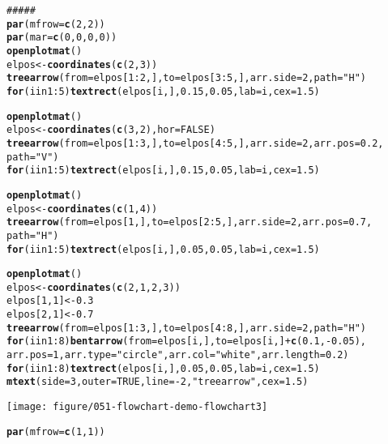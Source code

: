 \documentclass{article}\usepackage{graphicx, color}
\makeatletter
\def\maxwidth{ %
  \ifdim\Gin@nat@width>\linewidth
    \linewidth
  \else
    \Gin@nat@width
  \fi
}
\newcommand{\hlfunctioncall}[1]{\textcolor[rgb]{0.501960784313725,0,0.329411764705882}{\textbf{#1}}}%
\newcommand{\hlstring}[1]{\textcolor[rgb]{0.6,0.6,1}{#1}}%
\newcommand{\hlcomment}[1]{\textcolor[rgb]{0.180392156862745,0.6,0.341176470588235}{#1}}%
\newenvironment{kframe}{%
 \def\at@end@of@kframe{}%
 \ifinner\ifhmode%
  \def\at@end@of@kframe{\end{minipage}}%
  \begin{minipage}{\columnwidth}%
 \fi\fi%
 \def\FrameCommand##1{\hskip\@totalleftmargin \hskip-\fboxsep
 \colorbox{shadecolor}{##1}\hskip-\fboxsep
     \hskip-\linewidth \hskip-\@totalleftmargin \hskip\columnwidth}%
 \MakeFramed {\advance\hsize-\width
   \@totalleftmargin\z@ \linewidth\hsize
   \@setminipage}}%
 {\par\unskip\endMakeFramed%
 \at@end@of@kframe}
\newenvironment{knitrout}{}{} %
\makeatother
\begin{document}
\begin{knitrout}
\begin{kframe}
\begin{alltt}
\hlcomment{#####}
\hlfunctioncall{par}(mfrow = \hlfunctioncall{c}(2, 2))
\hlfunctioncall{par}(mar = \hlfunctioncall{c}(0, 0, 0, 0))
\hlfunctioncall{openplotmat}()
elpos <- \hlfunctioncall{coordinates}(\hlfunctioncall{c}(2, 3))
\hlfunctioncall{treearrow}(from = elpos[1:2, ], to = elpos[3:5, ], arr.side = 2, path = \hlstring{"H"})
\hlfunctioncall{for} (i in 1:5) \hlfunctioncall{textrect}(elpos[i, ], 0.15, 0.05, lab = i, cex = 1.5)

\hlfunctioncall{openplotmat}()
elpos <- \hlfunctioncall{coordinates}(\hlfunctioncall{c}(3, 2), hor = FALSE)
\hlfunctioncall{treearrow}(from = elpos[1:3, ], to = elpos[4:5, ], arr.side = 2, arr.pos = 0.2, 
    path = \hlstring{"V"})
\hlfunctioncall{for} (i in 1:5) \hlfunctioncall{textrect}(elpos[i, ], 0.15, 0.05, lab = i, cex = 1.5)

\hlfunctioncall{openplotmat}()
elpos <- \hlfunctioncall{coordinates}(\hlfunctioncall{c}(1, 4))
\hlfunctioncall{treearrow}(from = elpos[1, ], to = elpos[2:5, ], arr.side = 2, arr.pos = 0.7, 
    path = \hlstring{"H"})
\hlfunctioncall{for} (i in 1:5) \hlfunctioncall{textrect}(elpos[i, ], 0.05, 0.05, lab = i, cex = 1.5)

\hlfunctioncall{openplotmat}()
elpos <- \hlfunctioncall{coordinates}(\hlfunctioncall{c}(2, 1, 2, 3))
elpos[1, 1] <- 0.3
elpos[2, 1] <- 0.7
\hlfunctioncall{treearrow}(from = elpos[1:3, ], to = elpos[4:8, ], arr.side = 2, path = \hlstring{"H"})
\hlfunctioncall{for} (i in 1:8) \hlfunctioncall{bentarrow}(from = elpos[i, ], to = elpos[i, ] + \hlfunctioncall{c}(0.1, -0.05), 
    arr.pos = 1, arr.type = \hlstring{"circle"}, arr.col = \hlstring{"white"}, arr.length = 0.2)
\hlfunctioncall{for} (i in 1:8) \hlfunctioncall{textrect}(elpos[i, ], 0.05, 0.05, lab = i, cex = 1.5)
\hlfunctioncall{mtext}(side = 3, outer = TRUE, line = -2, \hlstring{"treearrow"}, cex = 1.5)
\end{alltt}
\end{kframe}
\texttt{[image: figure/051-flowchart-demo-flowchart3]} 
\begin{kframe}\begin{alltt}



\hlfunctioncall{par}(mfrow = \hlfunctioncall{c}(1, 1))


\end{alltt}
\end{kframe}
\end{knitrout}
\end{document}
